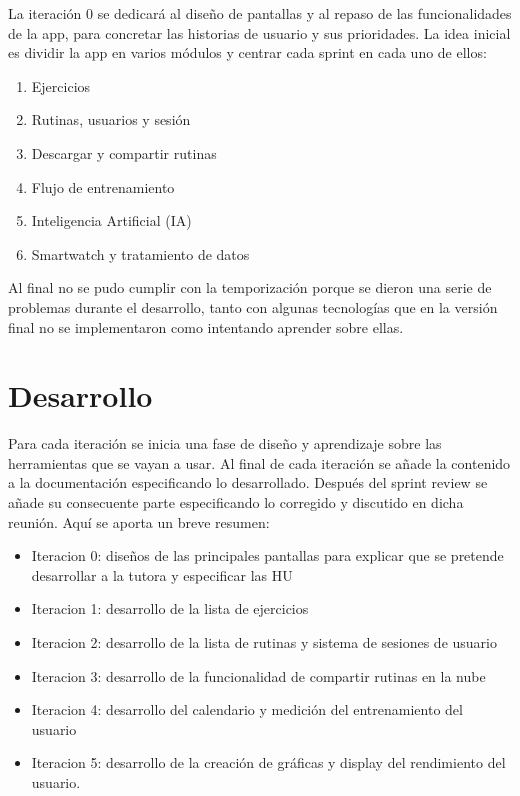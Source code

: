 La iteración 0 se dedicará al diseño de pantallas y al repaso de las funcionalidades de la app, para concretar las historias de usuario y sus prioridades. La idea inicial es dividir la app en varios módulos y centrar cada sprint en cada uno de ellos:

\begin{enumerate}
  \item Ejercicios
  \item Rutinas, usuarios y sesión
  \item Descargar y compartir rutinas
  \item Flujo de entrenamiento
  \item Inteligencia Artificial (IA)
  \item Smartwatch y tratamiento de datos
\end{enumerate}

Al final no se pudo cumplir con la temporización porque se dieron una serie de problemas durante el desarrollo, tanto con algunas tecnologías que en la versión final no se implementaron como intentando aprender sobre ellas.

\section{Desarrollo}

Para cada iteración se inicia una fase de diseño y aprendizaje sobre las herramientas que se vayan a usar. Al final de cada iteración se añade la contenido a la documentación especificando lo desarrollado. Después del sprint review se añade su consecuente parte especificando lo corregido y discutido en dicha reunión. Aquí se aporta un breve resumen:

\begin{itemize}
	\item Iteracion 0: diseños de las principales pantallas para explicar que se pretende desarrollar a la tutora y especificar las HU
	\item Iteracion 1: desarrollo de la lista de ejercicios
	\item Iteracion 2: desarrollo de la lista de rutinas y sistema de sesiones de usuario
	\item Iteracion 3: desarrollo de la funcionalidad de compartir rutinas en la nube
	\item Iteracion 4: desarrollo del calendario y medición del entrenamiento del usuario
	\item Iteracion 5: desarrollo de la creación de gráficas y display del rendimiento del usuario.
\end{itemize}

